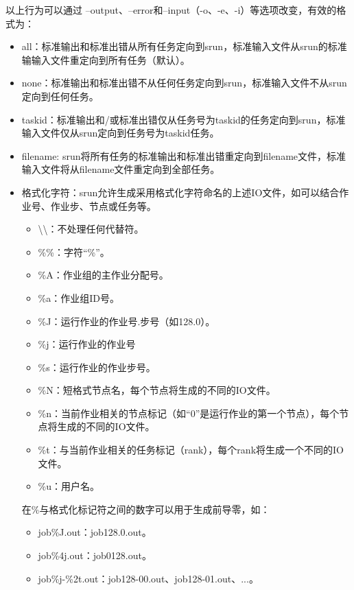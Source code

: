 以上行为可以通过 --output、--error和--input（-o、-e、-i）等选项改变，有效的格式为：
\begin{itemize}
	\item all：标准输出和标准出错从所有任务定向到srun，标准输入文件从srun的标准输输入文件重定向到所有任务（默认）。
    \item none：标准输出和标准出错不从任何任务定向到srun，标准输入文件不从srun定向到任何任务。
    \item taskid：标准输出和/或标准出错仅从任务号为taskid的任务定向到srun，标准输入文件仅从srun定向到任务号为taskid任务。
    \item filename: srun将所有任务的标准输出和标准出错重定向到filename文件，标准输入文件将从filename文件重定向到全部任务。
    \item 格式化字符：srun允许生成采用格式化字符命名的上述IO文件，如可以结合作业号、作业步、节点或任务等。
\begin{itemize}
	\item \textbackslash\textbackslash：不处理任何代替符。
    \item \%\%：字符``\%''。
    \item \%A：作业组的主作业分配号。
    \item \%a：作业组ID号。
    \item \%J：运行作业的作业号.步号（如128.0）。
    \item \%j：运行作业的作业号
    \item \%s：运行作业的作业步号。
    \item \%N：短格式节点名，每个节点将生成的不同的IO文件。
    \item \%n：当前作业相关的节点标记（如``0''是运行作业的第一个节点），每个节点将生成的不同的IO文件。
    \item \%t：与当前作业相关的任务标记（rank），每个rank将生成一个不同的IO文件。
    \item \%u：用户名。
\end{itemize}
在\%与格式化标记符之间的数字可以用于生成前导零，如：
\begin{itemize}
   \item job\%J.out：job128.0.out。
   \item job\%4j.out：job0128.out。
   \item job\%j-\%2t.out：job128-00.out、job128-01.out、...。
\end{itemize}
\end{itemize}


